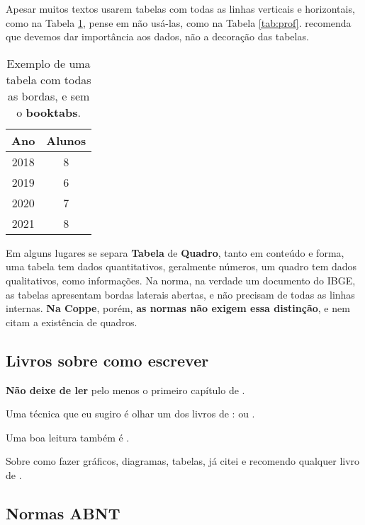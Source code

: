 \documentclass{article}
\begin{document}
Apesar muitos textos usarem tabelas com todas as linhas verticais e horizontais, como na Tabela \ref{tab:tab3}, pense em não usá-las, como na Tabela \ref{tab:prof}. \citeauthor{ei} recomenda que devemos dar importância aos dados, não a decoração das tabelas.


\begin{table}[htb]
    \centering
        \caption{Exemplo de uma tabela com todas as bordas, e sem o \textbf{booktabs}.}
\begin{tabular}{|c|c|}
    \hline
    Ano  & Alunos \\ \hline
    2018 & 8      \\ \hline
    2019 & 6      \\ \hline
    2020 & 7      \\ \hline
    2021 & 8      \\ \hline
\end{tabular}

    \label{tab:tab3}
\end{table}

Em alguns lugares se separa \textbf{Tabela} de \textbf{Quadro}, tanto em conteúdo e forma, uma tabela tem dados quantitativos, geralmente números, um quadro tem dados qualitativos, como informações. Na norma, na verdade um documento do IBGE\citep{nat}, as tabelas apresentam bordas laterais abertas, e não precisam de todas as linhas internas. \textbf{Na Coppe}, porém, \textbf{as normas não exigem essa distinção}, e nem citam a existência de quadros. 

\subsection{Livros sobre como escrever}    

\textbf{Não deixe de ler} pelo menos o primeiro capítulo de \citep{mw}.

Uma técnica que eu sugiro é olhar um dos  livros de \citeauthor{minto1}:  \citep{minto1} ou \citep{minto2}. 

Uma boa leitura também é \citep{wcs}.

Sobre como fazer gráficos, diagramas, tabelas, já citei \citep{ei} e recomendo qualquer livro de \citeauthor{ei}.

\subsection{Normas ABNT}
\end{document}
